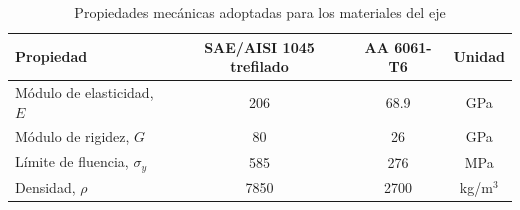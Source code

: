 \documentclass[12pt,a4paper]{article}
\begin{document}
\begin{table}[H]
\centering
\caption{Propiedades mecánicas adoptadas para los materiales del eje}
\begin{tabular}{lccc}
\toprule
\textbf{Propiedad} & \textbf{SAE/AISI 1045 trefilado} & \textbf{AA 6061-T6} & \textbf{Unidad} \\
\midrule
Módulo de elasticidad, $E$ & 206 & 68.9 & GPa \\
Módulo de rigidez, $G$ & 80 & 26 & GPa \\
Límite de fluencia, $\sigma_y$ & 585 & 276 & MPa \\
Densidad, $\rho$ & 7850 & 2700 & kg/m$^3$ \\
\bottomrule
\end{tabular}
\label{tab:propiedades_materiales}
\end{table}
\end{document}
